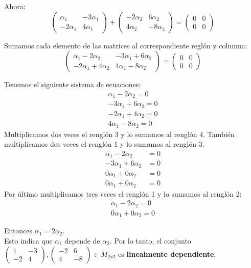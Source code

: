 \documentclass[letterpaper]{article}
\renewcommand{\*}{\cdot}
\theoremstyle{definition}
\begin{document}
Ahora:
$$\begin{pmatrix} \alpha_1 & -3\alpha_{1} \\ -2\alpha_{1} & 4\alpha_{1} \end{pmatrix} +
\begin{pmatrix} -2\alpha_{2} & 6\alpha_2 \\ 4\alpha_{2} & -8\alpha_{2} \end{pmatrix} = \begin{pmatrix} 	0 & 0 \\ 0 & 0 \end{pmatrix}$$

Sumamos cada elemento de las matrices al correspondiente reglón y columna:\\
		$$\begin{pmatrix}
		\alpha_{1}-2\alpha_{2} & -3\alpha_{1}+6\alpha_{2} \\ -2\alpha_{1}+4\alpha_{2} & 4\alpha_{1}-8\alpha_{2}
		\end{pmatrix} = \begin{pmatrix}
		0 & 0 \\ 0 & 0
		\end{pmatrix}$$

Tenemos el siguiente sistema de ecuaciones:
	\begin{align*}
		\alpha_{1}-2\alpha_{2} = 0\\
		-3\alpha_{1} + 6\alpha_{2} = 0\\
		-2\alpha_{1}+4\alpha_{2}= 0\\
		4\alpha_{1}-8\alpha_{2}= 0
	\end{align*}
Multiplicamos dos veces el renglón 3 y lo sumamos al renglón 4. También multiplicamos dos veces el renglón 1 y lo sumamos al renglón 3.
\begin{align*}	
	\alpha_{1}-2\alpha_{2} &= 0\\
	-3\alpha_{1}+6\alpha_{2}&= 0\\
	0\alpha_{1}+0\alpha_{2}&=0\\
	0\alpha_{1}+0\alpha_{2}&= 0
\end{align*}
Por último multiplicamos tres veces el renglón 1 y lo sumamos al renglón 2:
\begin{align*}
	\alpha_{1}-2\alpha_{2}=0\\
	0\alpha_{1}+0\alpha_{2}=0
\end{align*}	

Entonces $\alpha_{1}=2\alpha_{2}$.\\ Esto indica que $\alpha_{1}$ depende de $\alpha_{2}$. Por lo tanto, el conjunto  $\begin{pmatrix} 1 & -3 \\ -2 & 4 \end{pmatrix} , \begin{pmatrix} -2 & 6 \\ 4 & -8 \end{pmatrix}\in M_{2x2}$  es \textbf{linealmente dependiente}.
\end{document}
